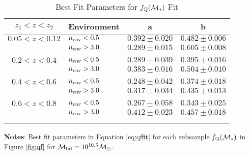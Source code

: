 \documentclass{emulateapj}
\def \lowenvthresh {0.5}
\def \highenvthresh {3.0}
\begin{document}
\begin{table} 
  \caption{Best Fit Parameters for $f_{\rm{Q}}(\mathcal{M}_{*})$ Fit}
  \label{tab:bestfitparam}
  \begin{center}
    \leavevmode
    \begin{tabular}{clcc} \hline \hline              
    $z_1 < z < z_2$ &Environment        &a  &b  \\ \hline 
$0.05 < z< 0.12$ &$n_{\rm{env}} < \lowenvthresh$ & $0.392 \pm 0.020$ & $0.482 \pm 0.006$ \\
               &$n_{\rm{env}} > \highenvthresh$ & $0.289 \pm 0.015$ & $0.605 \pm 0.008$ \\ 
                              &               &                       &                           \\ \hline   
$0.2 < z <0.4$ & $n_{\rm{env}} < \lowenvthresh$ & $0.289 \pm 0.039$ & $0.395 \pm 0.016$ \\
               &$n_{\rm{env}} > \highenvthresh$ & $0.383 \pm 0.016$ & $0.504 \pm 0.010$ \\
               &               &                       &                           \\ \hline
$0.4 < z < 0.6$      &$n_{\rm{env}} < \lowenvthresh$ & $0.248 \pm 0.042$ & $0.374 \pm 0.018$ \\
               &$n_{\rm{env}} > \highenvthresh$ & $0.317 \pm 0.034$ & $0.435 \pm 0.013$ \\
               &               &                       &                           \\ \hline
$0.6 < z < 0.8$      &$n_{\rm{env}} < \lowenvthresh$ & $0.267 \pm 0.058$ & $0.343 \pm 0.025$ \\
               &$n_{\rm{env}} > \highenvthresh$            & $0.412 \pm 0.023$ & $0.457 \pm 0.018$ \\
               &               &                       &                           \\ \hline
  \multicolumn{4}{l}{}                                             \\       
    \end{tabular} \par
    \end{center}
    {\bf Notes}: Best fit parameters in Equation \ref{eq:qffit} for each subsample $f_{\rm{Q}}(\mathcal{M}_{*})$ in Figure \ref{fig:qf} for $\mathcal{M}_{\rm{fid}} = 10^{10.5} \mathcal{M}_{\odot}$.
\end{table}
\end{document}
